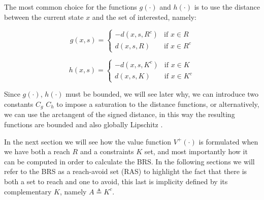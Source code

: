 The most common choice for the functions $g(\cdot)$ and $h(\cdot)$ is to use the distance between the current state $x$ and the set of interested, namely:

\begin{equation}
\label{g}
    g(x, s) =
\left\{
	\begin{array}{ll}
		-d(x, s, R^c)  & \mbox{if } x \in R \\
		d(x, s, R) & \mbox{if } x \in R^c
	\end{array}
\right.
\end{equation}

\begin{equation}
\label{h}
    h(x, s) =
\left\{
	\begin{array}{ll}
		-d(x, s, K^c)  & \mbox{if } x \in K \\
		d(x, s, K) & \mbox{if } x \in K^c
	\end{array}
\right.
\end{equation}

Since $g(\cdot)$, $h(\cdot)$ must be bounded, we will see later why, we can introduce two constants $C_g$ $C_h$ to impose a saturation to the distance functions, or alternatively, we can use the arctangent of the signed distance, in this way the resulting functions are bounded and also globally Lipschitz \cite{reach_avoid_no_dist}. 

In the next section we will see how the value function $V^+(\cdot)$ is formulated when we have both a reach $R$ and a constraints $K$ set, and most importantly how it can be computed in order to calculate the BRS. In the following sections we will refer to the BRS as a reach-avoid set (RAS) to highlight the fact that there is both a set to reach and one to avoid, this last is implicity defined by its complementary $K$, namely $A \triangleq K^c$.

